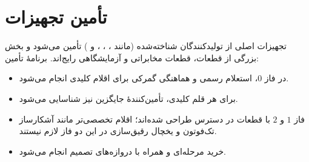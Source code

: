 \section{تأمین تجهیزات}
\label{sec:procurement}
تجهیزات اصلی از تولیدکنندگان شناخته‌شده (مانند ، ، ،  و ) تأمین می‌شود و بخش بزرگی از قطعات، قطعات مخابراتی و آزمایشگاهی رایج‌اند. برنامهٔ تأمین:
\begin{itemize}
\item در فاز $0$، استعلام رسمی و هماهنگی گمرکی برای اقلام کلیدی انجام می‌شود.
\item برای هر قلم کلیدی، تأمین‌کنندهٔ جایگزین نیز شناسایی می‌شود.
\item فاز $1$ و $2$ با قطعات در دسترس طراحی شده‌اند؛ اقلام تخصصی‌تر مانند آشکارساز تک‌فوتون و یخچال رقیق‌سازی در این دو فاز لازم نیستند.
\item خرید مرحله‌ای و همراه با دروازه‌های تصمیم انجام می‌شود.
\end{itemize}
